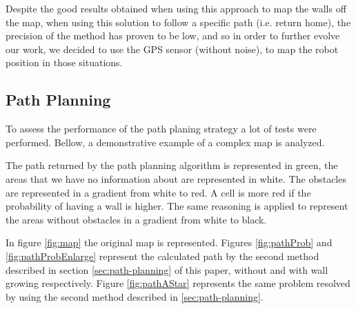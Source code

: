 \documentclass[oribibl]{llncs}
\begin{document}
Despite the good results obtained when using this approach to map the walls off the map, when using this solution to follow a specific path (i.e. return home), the precision of the method has proven to be low, and so in order to further evolve our work, we decided to use the GPS sensor (without noise), to map the robot position in  those situations.

\subsection{Path Planning}
To assess the performance of the path planing strategy a lot of tests were performed. Bellow, a demonstrative example of a complex map is analyzed. 

The path returned by the path planning algorithm is represented in green, the areas that we have no information about are represented in white. The obstacles are represented in a gradient from white to red. A cell is more red if the probability of having a wall is higher. The same reasoning is applied to represent the areas without obstacles in a gradient from white to black.

In figure \ref{fig:map} the original map is represented. Figures \ref{fig:pathProb} and  \ref{fig:pathProbEnlarge} represent the calculated path by the second method described in section \ref{sec:path-planning} of this paper, without and with wall growing respectively. Figure \ref{fig:pathAStar} represents the same problem resolved by using the second method described in \ref{sec:path-planning}.
\end{document}
